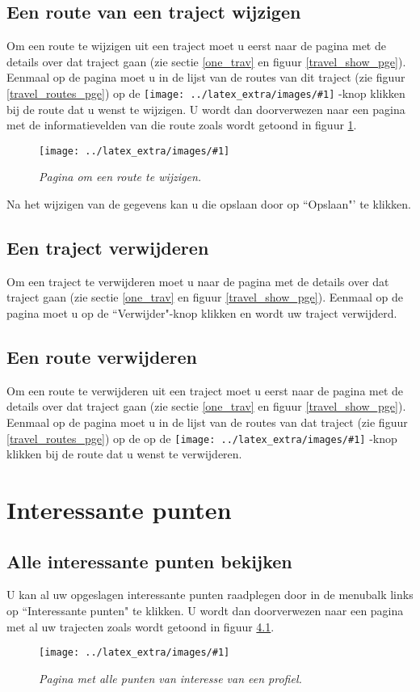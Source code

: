 \documentclass[11pt,twoside,a4paper]{report}
\newcommand*{\copyimageH}[4]{ 			%
	\begin{figure}[Ht]
	\texttt{[image: ../latex\_extra/images/\#1]}
	\caption{\textit{#4}}\label{#2}
	\end{figure}
}
\newcommand*{\copyimageText}[2]{ 			%
	\texttt{[image: ../latex\_extra/images/\#1]}
}
\begin{document}
		\section{Een route van een traject wijzigen}\label{edit_route}
Om een  route te wijzigen uit een traject moet u eerst naar de pagina met de details over dat traject gaan (zie sectie \ref{one_trav} en figuur \ref{travel_show_pge}). Eenmaal op de pagina moet u in de lijst van de routes van dit traject (zie figuur \ref{travel_routes_pge}) op de \copyimageText{edit_route_btn.jpg}{1em}-knop klikken bij de route dat u wenst te wijzigen. U wordt dan doorverwezen naar een pagina met de informatievelden van die route zoals wordt getoond in figuur \ref{route_edit_pge}.
\copyimageH{route_edit.jpg}{route_edit_pge}{\textwidth}{Pagina om een route te wijzigen.}
Na het wijzigen van de gegevens kan u die opslaan door op ``Opslaan"' te klikken.


		\section{Een traject verwijderen}\label{delete_trav}
Om een  traject te verwijderen moet u naar de pagina met de details over dat traject gaan (zie sectie \ref{one_trav} en figuur \ref{travel_show_pge}). Eenmaal op de pagina moet u op de ``Verwijder"-knop klikken en wordt uw traject verwijderd.\\

		\section{Een route verwijderen}\label{delete_route}
Om een  route te verwijderen uit een traject moet u eerst naar de pagina met de details over dat traject gaan (zie sectie \ref{one_trav} en figuur \ref{travel_show_pge}). Eenmaal op de pagina moet u in de lijst van de routes van dat traject (zie figuur \ref{travel_routes_pge}) op de  op de \copyimageText{delete_route_btn.jpg}{1em}-knop klikken bij de route dat u wenst te verwijderen.\\

\chapter{Interessante punten}
		\section{Alle interessante punten bekijken}\label{all_poi}
U kan al uw opgeslagen interessante punten raadplegen door in de menubalk links op ``Interessante punten" te klikken. U wordt dan doorverwezen naar een pagina met al uw trajecten zoals wordt getoond in figuur \ref{poi_list_pge}.
\copyimageH{poi_list.jpg}{poi_list_pge}{\textwidth}{Pagina met alle punten van interesse van een profiel.}
\end{document}
